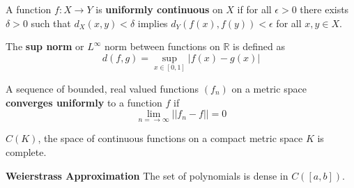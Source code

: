 \documentclass[12pt]{article}
\begin{document}
A function $f : X \rightarrow Y$ is \textbf{uniformly continuous} on $X$ if 
for all $\epsilon > 0$ there exists $\delta > 0$ such that $d_X(x, y) <
\delta$ implies $d_Y(f(x), f(y)) < \epsilon$ for all $x, y \in X$. 

The \textbf{sup norm} or $L^\infty$ norm between functions on $\mathbb{R}$
is defined as
\[
    d(f, g) = \sup_{x \in [0, 1]} |f(x) - g(x)|
\]

A sequence of bounded, real valued functions $(f_n)$ on a metric space
\textbf{converges uniformly} to a function $f$ if
\[
    \lim_{n = \rightarrow \infty} || f_n -f || = 0
\]

$C(K)$, the space of continuous functions on a compact metric space $K$ is
complete.

\textbf{Weierstrass Approximation} The set of polynomials is dense in
$C([a, b])$.
\end{document}
